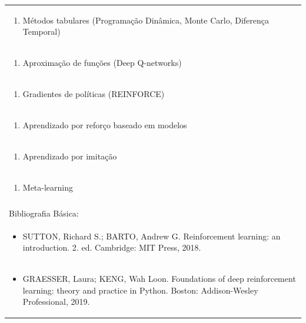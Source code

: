 \documentclass[11pt]{article}
\begin{document}
\begin{center}
\begin{longtable}{|p{4cm}|p{4cm}|p{4cm}|p{4cm}|}
\multicolumn{4}{|p{\dimexpr 16cm + 6\tabcolsep\relax}|}{\begin{enumerate}[start=2]\item Métodos tabulares (Programação Dinâmica, Monte Carlo, Diferença Temporal)\end{enumerate}}\\
\multicolumn{4}{|p{\dimexpr 16cm + 6\tabcolsep\relax}|}{\begin{enumerate}[start=3]\item Aproximação de funções (Deep Q-networks)\end{enumerate}}\\
\multicolumn{4}{|p{\dimexpr 16cm + 6\tabcolsep\relax}|}{\begin{enumerate}[start=4]\item Gradientes de políticas (REINFORCE)\end{enumerate}}\\
\multicolumn{4}{|p{\dimexpr 16cm + 6\tabcolsep\relax}|}{\begin{enumerate}[start=5]\item Aprendizado por reforço baseado em modelos\end{enumerate}}\\
\multicolumn{4}{|p{\dimexpr 16cm + 6\tabcolsep\relax}|}{\begin{enumerate}[start=6]\item Aprendizado por imitação\end{enumerate}}\\
\multicolumn{4}{|p{\dimexpr 16cm + 6\tabcolsep\relax}|}{\begin{enumerate}[start=7]\item Meta-learning\end{enumerate}}\\
\multicolumn{4}{|p{\dimexpr 16cm + 6\tabcolsep\relax}|}{}\\
\hline
\multicolumn{4}{|p{16cm}|}{Bibliografia Básica:}\\*
\multicolumn{4}{|p{\dimexpr 16cm + 6\tabcolsep\relax}|}{\begin{itemize}\item SUTTON, Richard S.; BARTO, Andrew G. Reinforcement learning: an introduction. 2. ed. Cambridge: MIT Press, 2018.\end{itemize}}\\
\multicolumn{4}{|p{\dimexpr 16cm + 6\tabcolsep\relax}|}{\begin{itemize}\item GRAESSER, Laura; KENG, Wah Loon. Foundations of deep reinforcement learning: theory and practice in Python. Boston: Addison-Wesley Professional, 2019.\end{itemize}}\\

\end{longtable}
\end{center}
\end{document}
